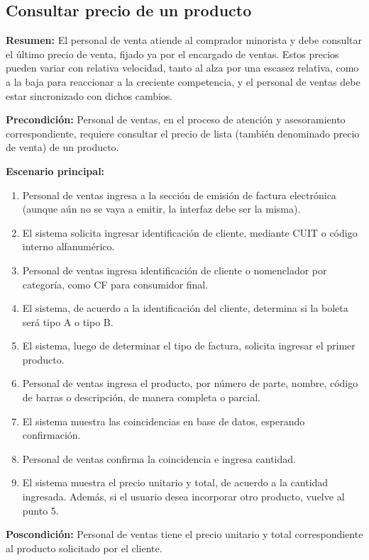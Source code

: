 \pagebreak

\subsection{Consultar precio de un producto}

\textbf{Resumen:}
El personal de venta atiende al comprador minorista y debe consultar el último precio de venta,
fijado ya por el encargado de ventas.
Estos precios pueden variar con relativa velocidad,
tanto al alza por una escasez relativa,
como a la baja para reaccionar a la creciente competencia,
y el personal de ventas debe estar sincronizado con dichos cambios.

\textbf{Precondición:} 
Personal de ventas, en el proceso de atención y asesoramiento correspondiente,
requiere consultar el precio de lista (también denominado precio de venta)
de un producto.

\textbf{Escenario principal:}
\begin{enumerate}
	\item Personal de ventas ingresa a la sección de emisión de factura electrónica (aunque aún no se vaya a emitir, la interfaz debe ser la misma).
	\item El sistema solicita ingresar identificación de cliente, mediante CUIT o código interno alfanumérico.
	\item Personal de ventas ingresa identificación de cliente o nomenclador por categoría, como CF para consumidor final.
	\item El sistema, de acuerdo a la identificación del cliente, determina si la boleta será tipo A o tipo B.
	\item El sistema, luego de determinar el tipo de factura, solicita ingresar el primer producto.
	\item Personal de ventas ingresa el producto, por número de parte, nombre, código de barras o descripción, de manera completa o parcial.
	\item El sistema muestra las coincidencias en base de datos, esperando confirmación.
	\item Personal de ventas confirma la coincidencia e ingresa cantidad.
	\item El sistema muestra el precio unitario y total, de acuerdo a la cantidad ingresada.
	Además, si el usuario desea incorporar otro producto, vuelve al punto 5.
\end{enumerate}

\textbf{Poscondición:}
Personal de ventas tiene el precio unitario y total correspondiente al producto solicitado por el cliente.

